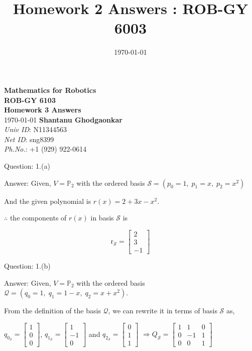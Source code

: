 \documentclass[a4paper]{article}
\title{Homework 2 Answers : ROB-GY 6003}
\author{\myName}
\date{\today}
\newcommand{\myName}{\textbf{Shantanu Ghodgaonkar}\\\textit{Univ ID}: N11344563\\\textit{Net ID}: sng8399\\\textit{Ph.No.}: +1 (929) 922-0614}
\begin{document}
	
	\begin{titlepage}
	    \centering
	    \vspace{2cm}
	    \Huge\textbf{Mathematics for Robotics \\ ROB-GY 6103 \\ Homework 3 Answers}
	    \vspace{1cm}
	    \\ \Large \today
	    \vfill
	    \Large \myName
	\end{titlepage}
	
	\begin{qalist}			
		\item[Question: 1.(a)] \setcounter{equation}{0} %
		\item[Answer:] Given, $V = {\mathbb{P}}_{2}$ with the ordered basis $\mathcal{S} = \left( {p}_{0} = 1,\;{p}_{1} = x,\;{p}_{2} = {x}^{2}\right)$ 
		
		And the given polynomial is $r(x) = 2 + 3x - {x}^{2}$.
		
		
		$\therefore$ the components of $r(x)$ in basis $\mathcal{S}$ is 
		
		\begin{equation}
			{\text{r}}_{\mathcal{S}} = \begin{bmatrix} 2 \\ 3 \\ -1 \end{bmatrix}
		\end{equation}
		
		\item[Question: 1.(b)] \setcounter{equation}{0} %
		\item[Answer:] Given, $V = {\mathbb{P}}_{2}$ with the ordered basis $\mathcal{Q} = \left( {q}_{0} = 1,\;{q}_{1} = 1 - x,\;{q}_{2} = x + {x}^{2}\right)$. 
		
		From the definition of the basis $\mathcal{Q}$, we can rewrite it in terms of basis $\mathcal{S}$ as, 
		
		${q}_{0_{\mathcal{S}}} = \begin{bmatrix}1 \\ 0 \\ 0\end{bmatrix}$, ${q}_{1_{\mathcal{S}}} = \begin{bmatrix}1 \\ -1 \\ 0\end{bmatrix}$ and ${q}_{2_{\mathcal{S}}} = \begin{bmatrix}0 \\ 1 \\ 1\end{bmatrix}$ $\Rightarrow {Q}_{\mathcal{S}} = \begin{bmatrix}1 & 1 & 0 \\ 0 & -1 & 1 \\ 0 & 0 & 1\end{bmatrix}$
		

\end{qalist}
\end{document}
